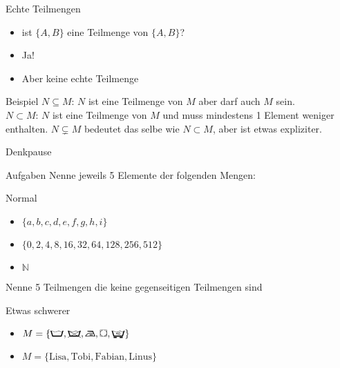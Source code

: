 \begin{frame}{Echte Teilmengen}
    \begin{itemize}
        \item ist $\{A,B\}$ eine Teilmenge von $\{A,B\}$?
              \pause
        \item \alert{Ja!}
              \pause
        \item Aber keine \alert{echte} Teilmenge
    \end{itemize}
    \pause
    \begin{exampleblock}{Beispiel}
        $N \subseteq M$: $N$ ist eine Teilmenge von $M$ aber darf auch $M$ sein.\\
        $N \subset M$: $N$ ist eine Teilmenge von $M$ und muss mindestens 1 Element weniger enthalten.
        $N \subsetneq M$ bedeutet das selbe wie $N \subset M$, aber ist etwas expliziter.
    \end{exampleblock}
\end{frame}

{
\begin{frame}[fragile]{Denkpause}
    \begin{alertblock}{Aufgaben}
        Nenne jeweils 5 Elemente der folgenden Mengen:
    \end{alertblock}

    \begin{block}{Normal}
        \begin{itemize}
            \item $\{a, b, c, d, e, f, g, h, i\}$
            \item $\{0, 2, 4, 8, 16, 32, 64, 128, 256, 512\}$
            \item $\mathbb N$
        \end{itemize}
    \end{block}
    Nenne 5 Teilmengen die keine gegenseitigen Teilmengen sind
    \begin{block}{Etwas schwerer}
        \begin{itemize}
            \item $M = \{\text{\WashCotton}, \text{\NoWash}, \text{\IroningII}, \text{\Tumbler}, \text{\SpecialForty} \}$
            \item $M = \{\text{Lisa}, \text{Tobi}, \text{Fabian}, \text{Linus}\}$
        \end{itemize}
    \end{block}
\end{frame}
}

